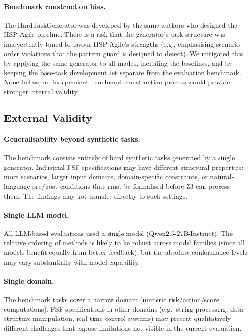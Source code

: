 \paragraph{Benchmark construction bias.}
The HardTaskGenerator was developed by the same authors who designed the HSP-Agile
pipeline.  There is a risk that the generator's task structure was inadvertently tuned
to favour HSP-Agile's strengths (e.g., emphasising scenario-order violations that the
pattern guard is designed to detect).  We mitigated this by applying the same
generator to all modes, including the baselines, and by keeping the base-task
development set separate from the evaluation benchmark.  Nonetheless, an independent
benchmark construction process would provide stronger internal validity.

\subsection{External Validity}

\paragraph{Generalisability beyond synthetic tasks.}
The benchmark consists entirely of hard synthetic tasks generated by a single
generator.  Industrial FSF specifications may have different structural properties:
more scenarios, larger input domains, domain-specific constraints, or natural-language
pre/post-conditions that must be formalised before Z3 can process them.  The findings
may not transfer directly to such settings.

\paragraph{Single LLM model.}
All LLM-based evaluations used a single model (Qwen2.5-27B-Instruct).  The
relative ordering of methods is likely to be robust across model families (since all
models benefit equally from better feedback), but the absolute conformance levels
may vary substantially with model capability.

\paragraph{Single domain.}
The benchmark tasks cover a narrow domain (numeric risk/action/score computations).
FSF specifications in other domains (e.g., string processing, data structure
manipulation, real-time control systems) may present qualitatively different
challenges that expose limitations not visible in the current evaluation.

